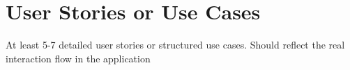 \section{User Stories or Use Cases}
At least 5-7 detailed user stories or structured use cases.
Should reflect the real interaction flow in the application